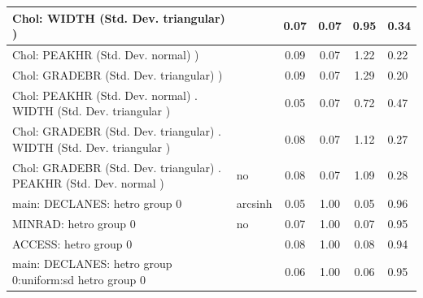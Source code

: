\begin{table}
\begin{center}
\begin{tabular}{|l|l|c|c|c|l|}
			\hline
			 Chol: WIDTH (Std. Dev. triangular) ) &  & 0.07 & 0.07 & 0.95 & 0.34 \\
			\hline
			 Chol: PEAKHR (Std. Dev. normal) ) &  & 0.09 & 0.07 & 1.22 & 0.22 \\
			\hline
			 Chol: GRADEBR (Std. Dev. triangular) ) &  & 0.09 & 0.07 & 1.29 & 0.20 \\
			\hline
			 Chol: PEAKHR (Std. Dev. normal) . WIDTH (Std. Dev.   triangular ) &  & 0.05 & 0.07 & 0.72 & 0.47 \\
			\hline
			 Chol: GRADEBR (Std. Dev. triangular) . WIDTH (Std. Dev.   triangular ) &  & 0.08 & 0.07 & 1.12 & 0.27 \\
			\hline
			 Chol: GRADEBR (Std. Dev. triangular) . PEAKHR (Std. Dev.   normal ) & no & 0.08 & 0.07 & 1.09 & 0.28 \\
			\hline
			main: DECLANES: hetro group 0 & arcsinh & 0.05 & 1.00 & 0.05 & 0.96 \\
			\hline
			MINRAD: hetro group 0 & no & 0.07 & 1.00 & 0.07 & 0.95 \\
			\hline
			ACCESS: hetro group 0 &  & 0.08 & 1.00 & 0.08 & 0.94 \\
			\hline
			main: DECLANES: hetro group 0:uniform:sd  hetro group 0 &  & 0.06 & 1.00 & 0.06 & 0.95 \\
			\hline
		\end{tabular}
	\end{center}
\end{table}